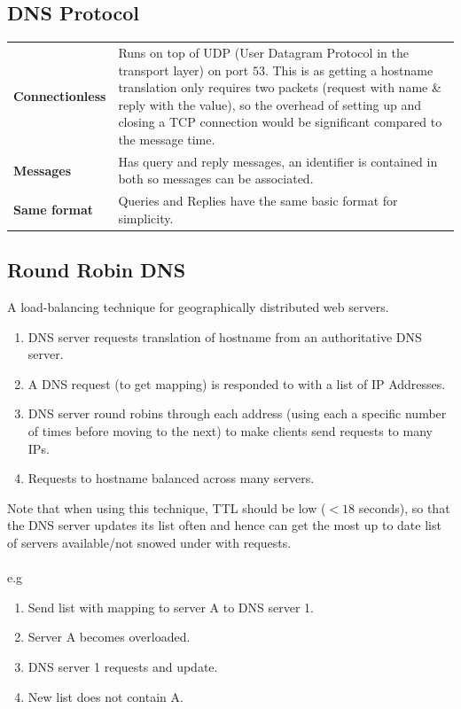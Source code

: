 \subsection{DNS Protocol}
\begin{tabular}{l p{}}
    \textbf{Connectionless} & Runs on top of UDP (User Datagram Protocol in the transport layer) on port $53$. This is as getting a hostname translation only requires two packets (request with name \& reply with the value), so the overhead of setting up and closing a TCP connection would be significant compared to the message time. \\
    \textbf{Messages}       & Has query and reply messages, an identifier is contained in both so messages can be associated.                                                                                                                                                                                                                 \\
    \textbf{Same format}    & Queries and Replies have the same basic format for simplicity.                                                                                                                                                                                                                                                  \\
\end{tabular}

\subsection{Round Robin DNS}
A load-balancing technique for geographically distributed web servers.
\\
\begin{enumerate}
    \setlength\itemsep{0em}
    \item DNS server requests translation of hostname from an authoritative DNS server.
    \item A DNS request (to get mapping) is responded to with a list of IP Addresses.
    \item DNS server round robins through each address (using each a specific number of times before moving to the next) to make clients send requests to many IPs.
    \item Requests to hostname balanced across many servers.
\end{enumerate}
Note that when using this technique, TTL should be low ($<18$ seconds), so that the DNS server updates its list often and hence can get the most up to date list of servers available/not snowed under with requests.
\\
\\ e.g
\begin{enumerate}
    \setlength\itemsep{0em}
    \item Send list with mapping to server A to DNS server 1.
    \item Server A becomes overloaded.
    \item DNS server 1 requests and update.
    \item New list does not contain A.
\end{enumerate}
